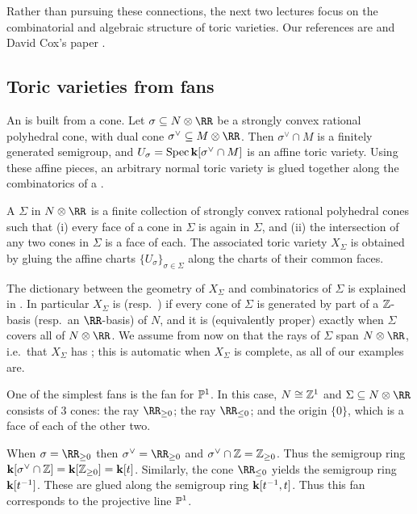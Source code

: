 \documentclass{amsart}
\begin{document}
Rather than pursuing these connections, the next two lectures focus on the combinatorial and algebraic structure of toric varieties. Our references are \cite[Ch.~3--5]{CLS2011} and David Cox's paper \cite{Cox95}.

\subsection{Toric varieties from fans}

An  is built from a cone. Let $\sigma\subseteq N\otimes\RR$ be a strongly convex rational polyhedral cone, with dual cone $\sigma^\vee\subseteq M\otimes\RR$. Then $\sigma^\vee\cap M$ is a finitely generated semigroup, and $U_\sigma=\operatorname{Spec} {\bf k}[\sigma^\vee\cap M]$ is an affine toric variety. Using these affine pieces, an arbitrary normal toric variety is glued together along the combinatorics of a .

\begin{defn}
  A  $\Sigma$ in $N\otimes\RR$ is a finite collection of strongly convex rational polyhedral cones such that (i) every face of a cone in $\Sigma$ is again in $\Sigma$, and (ii) the intersection of any two cones in $\Sigma$ is a face of each. The associated toric variety $X_\Sigma$ is obtained by gluing the affine charts $\{U_\sigma\}_{\sigma\in\Sigma}$ along the charts of their common faces.
\end{defn}

The dictionary between the geometry of $X_\Sigma$ and combinatorics of $\Sigma$ is explained in \cite[\S3.1]{CLS2011}. In particular $X_\Sigma$ is  (resp.\ ) if every cone of $\Sigma$ is generated by part of a $\mathbb Z$-basis (resp.\ an $\RR$-basis) of $N$, and it is  (equivalently proper) exactly when $\Sigma$ covers all of $N\otimes\RR$. We assume from now on that the rays of $\Sigma$ span $N\otimes\RR$, i.e.\ that $X_\Sigma$ has ; this is automatic when $X_\Sigma$ is complete, as all of our examples are.

\begin{example}
One of the simplest fans is the fan for $\mathbb P^1$.  In this case, $N\cong \mathbb Z^1$ and $\Sigma\subseteq N\otimes \RR$ consists of $3$ cones:  the ray $\RR_{\geq 0}$; the ray $\RR_{\leq 0}$; and the origin $\{0\}$, which is a face of each of the other two.

When $\sigma =\RR_{\geq 0}$ then $\sigma^\vee=\RR_{\geq 0}$ and $\sigma^\vee \cap \mathbb Z= \mathbb Z_{\geq 0}$.  Thus the semigroup ring ${\bf k}[\sigma^\vee\cap\mathbb Z]={\bf k}[\mathbb Z_{\geq 0}] ={\bf k}[t]$.  Similarly, the cone $\RR_{\leq 0}$ yields the semigroup ring ${\bf k}[t^{-1}]$.  These are glued along the semigroup ring ${\bf k}[t^{-1},t]$.  Thus this fan corresponds to the projective line $\mathbb P^1$.
\end{example}
\end{document}
